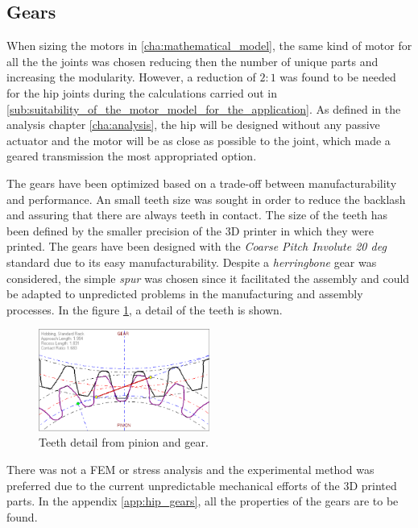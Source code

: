 \subsection{Gears} %
\label{sub:gears}
When sizing the motors in \ref{cha:mathematical_model}, the same kind of motor for all the the joints was chosen reducing then the number of unique parts and increasing the modularity.
However, a reduction of $2:1$ was found to be needed for the hip joints during the calculations carried out in \ref{sub:suitability_of_the_motor_model_for_the_application}.
As defined in the analysis chapter \ref{cha:analysis}, the hip will be designed without any passive actuator and the motor will be as close as possible to the joint, which made a geared transmission the most appropriated option.

The gears have been optimized based on a trade-off between manufacturability and performance.
An small teeth size was sought in order to reduce the backlash and assuring that there are always teeth in contact.
The size of the teeth has been defined by the smaller precision of the 3D printer in which they were printed.
The gears have been designed with the \textit{Coarse Pitch Involute 20 deg} standard due to its easy manufacturability.
Despite a \textit{herringbone} gear was considered, the simple \textit{spur} was chosen since it facilitated the assembly and could be adapted to unpredicted problems in the manufacturing and assembly processes. 
In the figure \ref{fig:teeth_detail}, a detail of the teeth is shown.

\begin{figure}[ht!]
  \centering
  \includegraphics[width=0.5\textwidth]{figures/hip_gears}
  \caption{Teeth detail from pinion and gear.}
  \label{fig:teeth_detail}
\end{figure}

There was not a FEM or stress analysis and the experimental method was preferred due to the current unpredictable mechanical efforts of the 3D printed parts.
In the appendix \ref{app:hip_gears}, all the properties of the gears are to be found.

